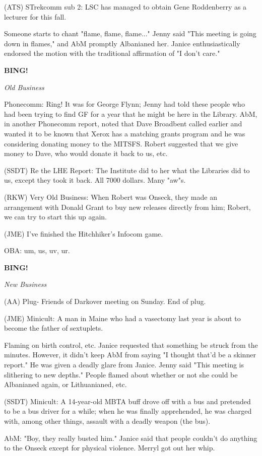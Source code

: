 \documentclass[12pt]{article}
\newcommand{\bing}{{\bf BING!} }
\newcommand{\goto}[1]{\bing \vskip 12pt \centerline{{\em{#1}}}}
\begin{document}
(ATS) STrekcomm sub 2: LSC has managed to obtain Gene Roddenberry as a lecturer for this fall.

Someone starts to chant "flame, flame, flame..." Jenny said "This meeting is going down in flames," and AbM promptly Albanianed her. Janice enthusiastically endorsed the motion with the traditional affirmation of "I don't care."

\goto{Old Business}

Phonecomm: Ring! It was for George Flynn; Jenny had told these people who had been trying to find GF for a year that he might be here in the Library. AbM, in another Phonecomm report, noted that Dave Broadbent called earlier and wanted it to be known that Xerox has a matching grants program and he was considering donating money to the MITSFS. Robert suggested that we give money to Dave, who would donate it back to us, etc.

(SSDT) Re the LHE Report: The Institute did to her what the Libraries did to us, except they took it back. All 7000 dollars. Many "aw"s.

(RKW) Very Old Business: When Robert was Onseck, they made an arrangement with Donald Grant to buy new releases directly from him; Robert, we can try to start this up again.

(JME) I've finished the Hitchhiker's Infocom game.

OBA: um, us, uv, ur.

\goto{New Business}

(AA) Plug- Friends of Darkover meeting on Sunday. End of plug.

(JME) Minicult: A man in Maine who had a vasectomy last year is about to become the father of sextuplets.

Flaming on birth control, etc. Janice requested that something be struck from the minutes. However, it didn't keep AbM from saying "I thought that'd be a skinner report." He was given a deadly glare from Janice. Jenny said "This meeting is slithering to new depths." People flamed about whether or not she could be Albanianed again, or Lithuanianed, etc.

(SSDT) Minicult: A 14-year-old MBTA buff drove off with a bus and pretended to be a bus driver for a while; when he was finally apprehended, he was charged with, among other things, assault with a deadly weapon (the bus).

AbM: "Boy, they really busted him." Janice said that people couldn't do anything to the Onseck except for physical violence. Merryl got out her whip.
\end{document}
